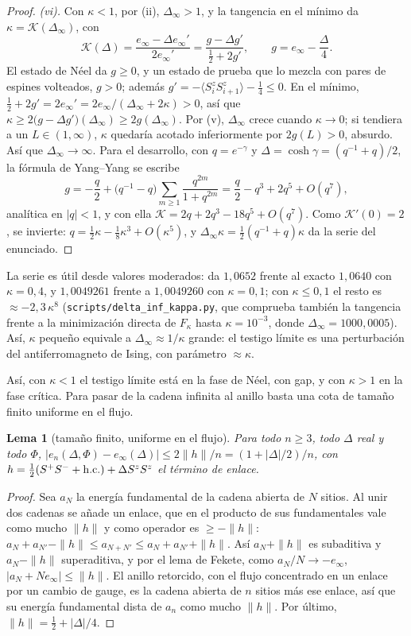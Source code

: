 \documentclass[11pt,a4paper]{article}
\newtheorem{lema}[teorema]{Lema}
\theoremstyle{remark}
\newcommand{\ev}[1]{\langle #1\rangle}
\begin{document}
\begin{proof}
\emph{(vi).} Con $\kappa<1$, por (ii), $\Delta_\infty>1$, y la tangencia en el mínimo da
$\kappa=\mathcal K(\Delta_\infty)$, con
\[
  \mathcal K(\Delta)=\frac{e_\infty-\Delta e_\infty'}{2e_\infty'}=\frac{g-\Delta g'}{\tfrac12+2g'},\qquad
  g=e_\infty-\frac\Delta4 .
\]
El estado de Néel da $g\ge0$, y un estado de prueba que lo mezcla con pares de espines volteados,
$g>0$; además $g'=-\ev{S^z_iS^z_{i+1}}-\tfrac14\le0$. En el mínimo,
$\tfrac12+2g'=2e_\infty'=2e_\infty/(\Delta_\infty+2\kappa)>0$, así que
$\kappa\ge2\big(g-\Delta g'\big)(\Delta_\infty)\ge2g(\Delta_\infty)$. Por (v), $\Delta_\infty$ crece
cuando $\kappa\to0$; si tendiera a un $L\in(1,\infty)$, $\kappa$ quedaría acotado inferiormente por
$2g(L)>0$, absurdo. Así que $\Delta_\infty\to\infty$. Para el desarrollo, con $q=e^{-\gamma}$ y
$\Delta=\cosh\gamma=(q^{-1}+q)/2$, la fórmula de Yang--Yang \cite{yang-yang} se escribe
\[
  g=-\frac q2+\big(q^{-1}-q\big)\sum_{m\ge1}\frac{q^{2m}}{1+q^{2m}}=\frac q2-q^3+2q^5+O(q^7),
\]
analítica en $|q|<1$, y con ella $\mathcal K=2q+2q^3-18q^5+O(q^7)$. Como $\mathcal K'(0)=2$, se
invierte: $q=\tfrac12\kappa-\tfrac18\kappa^3+O(\kappa^5)$, y $\Delta_\infty\kappa=\tfrac12(q^{-1}+q)\kappa$
da la serie del enunciado.
\end{proof}

La serie es útil desde valores moderados: da $1{,}0652$ frente al exacto $1{,}0640$ con $\kappa=0{,}4$,
y $1{,}0049261$ frente a $1{,}0049260$ con $\kappa=0{,}1$; con $\kappa\le0{,}1$ el resto es
$\approx-2{,}3\,\kappa^8$ (\texttt{scripts/delta\_inf\_kappa.py}, que comprueba también la tangencia
frente a la minimización directa de $F_\kappa$ hasta $\kappa=10^{-3}$, donde
$\Delta_\infty=1000{,}0005$). Así, $\kappa$ pequeño equivale a $\Delta_\infty\approx1/\kappa$ grande:
el testigo límite es una perturbación del antiferromagneto de Ising, con parámetro $\approx\kappa$.

Así, con $\kappa<1$ el testigo límite está en la fase de Néel, con gap, y con $\kappa>1$ en la fase
crítica. Para pasar de la cadena infinita al anillo basta una cota de tamaño finito uniforme en el
flujo.

\begin{lema}[tamaño finito, uniforme en el flujo]\label{lem:tamfinito}
Para todo $n\ge3$, todo $\Delta$ real y todo $\Phi$,
$|e_n(\Delta,\Phi)-e_\infty(\Delta)|\le2\|h\|/n=(1+|\Delta|/2)/n$, con
$h=\tfrac12(S^+S^-+{\rm h.c.})+\Delta S^zS^z$ el término de enlace.
\end{lema}

\begin{proof}
Sea $a_N$ la energía fundamental de la cadena abierta de $N$ sitios. Al unir dos cadenas se añade un
enlace, que en el producto de sus fundamentales vale como mucho $\|h\|$ y como operador es
$\ge-\|h\|$: $a_N+a_{N'}-\|h\|\le a_{N+N'}\le a_N+a_{N'}+\|h\|$. Así $a_N+\|h\|$ es subaditiva y
$a_N-\|h\|$ superaditiva, y por el lema de Fekete, como $a_N/N\to-e_\infty$,
$|a_N+Ne_\infty|\le\|h\|$. El anillo retorcido, con el flujo concentrado en un enlace por un cambio de
gauge, es la cadena abierta de $n$ sitios más ese enlace, así que su energía fundamental dista de $a_n$
como mucho $\|h\|$. Por último, $\|h\|=\tfrac12+|\Delta|/4$.
\end{proof}
\end{document}
